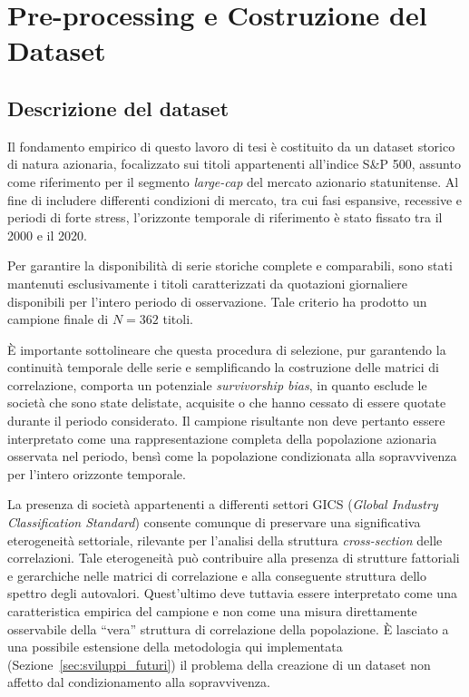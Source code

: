 \chapter{Pre-processing e Costruzione del Dataset}
\label{ch:preprocessing}

\section{Descrizione del dataset}
\label{sec:dataset_desc}

Il fondamento empirico di questo lavoro di tesi è costituito da un dataset storico di natura azionaria, focalizzato sui titoli appartenenti all'indice S\&P 500, assunto come riferimento per il segmento \emph{large-cap} del mercato azionario statunitense. Al fine di includere differenti condizioni di mercato, tra cui fasi espansive, recessive e periodi di forte stress, l'orizzonte temporale di riferimento è stato fissato tra il 2000 e il 2020.

Per garantire la disponibilità di serie storiche complete e comparabili, sono stati mantenuti esclusivamente i titoli caratterizzati da quotazioni giornaliere disponibili per l'intero periodo di osservazione. Tale criterio ha prodotto un campione finale di $N = 362$ titoli.

È importante sottolineare che questa procedura di selezione, pur garantendo la continuità temporale delle serie e semplificando la costruzione delle matrici di correlazione, comporta un potenziale \emph{survivorship bias}, in quanto esclude le società che sono state delistate, acquisite o che hanno cessato di essere quotate durante il periodo considerato. Il campione risultante non deve pertanto essere interpretato come una rappresentazione completa della popolazione azionaria osservata nel periodo, bensì come la popolazione condizionata alla sopravvivenza per l'intero orizzonte temporale.

La presenza di società appartenenti a differenti settori GICS (\emph{Global Industry Classification Standard}) consente comunque di preservare una significativa eterogeneità settoriale, rilevante per l'analisi della struttura \emph{cross-section} delle correlazioni. Tale eterogeneità può contribuire alla presenza di strutture fattoriali e gerarchiche nelle matrici di correlazione e alla conseguente struttura dello spettro degli autovalori. Quest'ultimo deve tuttavia essere interpretato come una caratteristica empirica del campione e non come una misura direttamente osservabile della ``vera'' struttura di correlazione della popolazione. È lasciato a una possibile estensione della metodologia qui implementata (Sezione~\ref{sec:sviluppi_futuri}) il problema della creazione di un dataset non affetto dal condizionamento alla sopravvivenza.


